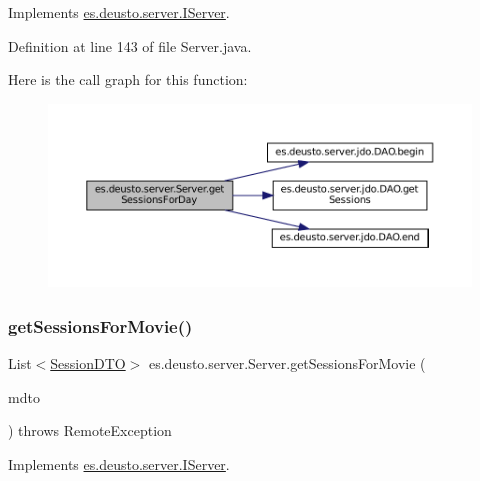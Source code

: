 Implements \mbox{\hyperlink{interfacees_1_1deusto_1_1server_1_1_i_server_aac50d6a77e30df4d4c15fcaf4ba979f5}{es.\+deusto.\+server.\+I\+Server}}.



Definition at line 143 of file Server.\+java.

Here is the call graph for this function\+:
\nopagebreak
\begin{figure}[H]
\begin{center}
\leavevmode
\includegraphics[width=350pt]{classes_1_1deusto_1_1server_1_1_server_a688ca336b3cbdb5c04ecdc4f23ff65d1_cgraph}
\end{center}
\end{figure}
\mbox{\label{classes_1_1deusto_1_1server_1_1_server_a33a6671bb4dc4bd9e23df10e53e5632d}} 
\subsubsection{\texorpdfstring{getSessionsForMovie()}{getSessionsForMovie()}}
{\footnotesize\ttfamily List$<$\mbox{\hyperlink{classes_1_1deusto_1_1server_1_1data_1_1_session_d_t_o}{Session\+D\+TO}}$>$ es.\+deusto.\+server.\+Server.\+get\+Sessions\+For\+Movie (\begin{DoxyParamCaption}\item[{\mbox{\hyperlink{classes_1_1deusto_1_1server_1_1data_1_1_movie_d_t_o}{Movie\+D\+TO}}}]{mdto }\end{DoxyParamCaption}) throws Remote\+Exception}



Implements \mbox{\hyperlink{interfacees_1_1deusto_1_1server_1_1_i_server_a33dc65de2a567be10bf2477ee28765f8}{es.\+deusto.\+server.\+I\+Server}}.



